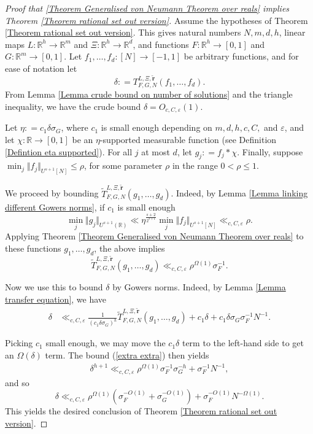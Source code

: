 \documentclass[12pt,a4paper,twoside,reqno]{amsart}
\numberwithin{equation}{section}
\begin{document}
\begin{proof}[Proof that \ref{Theorem Generalised von Neumann Theorem over reals} implies Theorem \ref{Theorem rational set out version}] Assume the hypotheses of Theorem \ref{Theorem rational set out version}. This gives natural numbers $N,m,d,h$, linear maps $L:\mathbb{R}^h\longrightarrow \mathbb{R}^m$ and $\Xi:\mathbb{R}^h \longrightarrow \mathbb{R}^d$, and functions $F:\mathbb{R}^h \longrightarrow [0,1]$ and $G:\mathbb{R}^m \longrightarrow [0,1]$. Let $f_1,\dots,f_d:[N]\longrightarrow [-1,1]$ be arbitrary functions, and for ease of notation let \[\delta: = T _{F,G,N}^{L,\Xi,\widetilde{\mathbf{r}}}(f_1,\dots,f_d).\] From Lemma \ref{Lemma crude bound on number of solutions} and the triangle inequality, we have the crude bound $\delta = O_{c,C,\varepsilon}(1)$. 

Let $\eta: = c_1\delta \sigma_G$, where $c_1$ is small enough depending on $m,d,h,c,C,$ and $\varepsilon$, and let $\chi: \mathbb{R}\longrightarrow [0,1]$ be an $\eta$-supported measurable function (see Definition \ref{Defintion eta supported}). For all $j$ at most $d$, let $g_j: = f_j\ast \chi$. Finally, suppose $\min _j \Vert f_j\Vert_{U^{s+1}[N]} \leqslant \rho$, for some parameter $\rho$ in the range $0<\rho \leqslant 1$.

We proceed by bounding $\widetilde{T}_{F,G,N}^{L,\Xi,\widetilde{\mathbf{r}}}(g_1,\dots,g_d)$. Indeed, by Lemma \ref{Lemma linking different Gowers norms}, if $c_1$ is small enough \[\min_j\Vert g_j\Vert_{U^{s+1}(\mathbb{R})} \ll \eta^{\frac{s+2}{2^{s+1}}} \min_j\Vert f_j\Vert_{U^{s+1}[N]} \ll_{c,C,\varepsilon} \rho.\]  Applying Theorem \ref{Theorem Generalised von Neumann Theorem over reals} to these functions $g_1,\dots,g_d$, the above implies 
\begin{equation}
\label{extra extra}
\widetilde{T}_{F,G,N}^{L,\Xi,\widetilde{\mathbf{r}}}(g_1,\dots,g_d)\ll_{c,C,\varepsilon} \rho^{\Omega(1)} \sigma_F^{-1}.
\end{equation}

Now we use this to bound $\delta$ by Gowers norms. Indeed, by Lemma \ref{Lemma transfer equation}, we have 
\begin{align*}
\delta &\ll_{c,C,\varepsilon} \frac{1}{(c_1 \delta \sigma_G)^h}\widetilde{T}_{F,G,N}^{L,\Xi,\widetilde{\mathbf{r}}}(g_1,\dots,g_d) + c_1\delta + c_1\delta\sigma_G\sigma_F^{-1} N^{-1} .
\end{align*} 

Picking $c_1$ small enough, we may move the $c_1\delta$ term to the left-hand side to get an $\Omega(\delta)$ term. The bound (\ref{extra extra}) then yields
\begin{align*}
\delta^{h+1} \ll_{c,C,\varepsilon} \rho^{\Omega(1)} \sigma_F^{-1} \sigma_G^{-h} + \sigma_F^{-1} N^{-1},
\end{align*} 
and so \[ \delta \ll_{c,C,\varepsilon} \rho^{\Omega(1)} (\sigma_F^{-O(1)} + \sigma_G^{-O(1)}) + \sigma_F^{-O(1)}N^{-\Omega(1)}.\]  This yields the desired conclusion of Theorem \ref{Theorem rational set out version}.
\end{proof}
\end{document}
